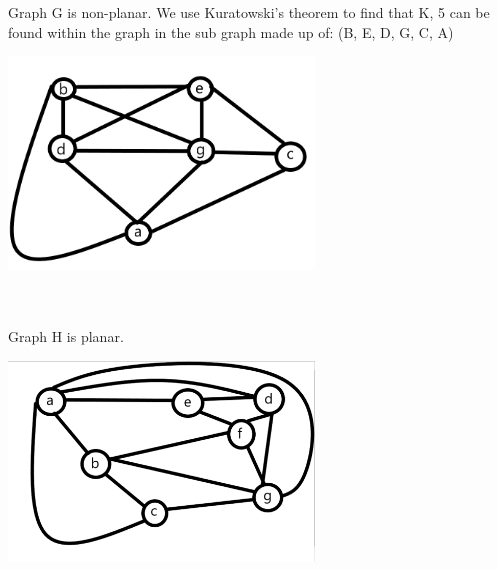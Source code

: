 \documentclass{article}
\begin{document}
\begin{solution}
\\\\ Graph G is non-planar. We use Kuratowski's theorem to find that K, 5 can be found within the graph in the sub graph made up of: (B, E, D, G, C, A)
\newline
\begin{center}
\includegraphics[width=3.2in]{HW5_pics/g5after.PNG}
\end{center}

\newline
\\\\ Graph H is planar.
\begin{center}
\includegraphics[width=3.2in]{HW5_pics/g6.PNG}
\end{center}

\end{solution}
\end{document}
